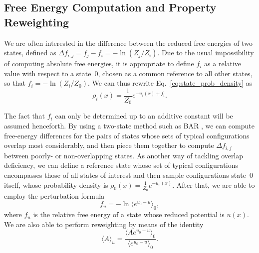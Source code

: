\documentclass[
    journal=jctcce,
    layout=twocolumn
]{achemso}
\begin{document}
\subsection{Free Energy Computation and Property Reweighting}
\label{sec:fep and reweighting}

We are often interested in the difference between the reduced free energies of two states, defined as $\Delta f_{i,j} = f_j - f_i = - \ln (Z_j/Z_i)$. Due to the usual impossibility of computing absolute free energies, it is appropriate to define $f_i$ as a relative value with respect to a state~$0$, chosen as a common reference to all other states, so that $f_i = -\ln (Z_i/Z_0)$. We can thus rewrite Eq.~\eqref{eq:state_prob_density} as
\begin{equation}
\label{eq:state_prob_density_Z0}
\rho_i(x) = \frac{1}{Z_0} e^{-u_i(x)+ f_i}.
\end{equation}

The fact that $f_i$ can only be determined up to an additive constant will be assumed henceforth. By using a two-state method such as BAR \cite{Bennett_1976}, we can compute free-energy differences for the pairs of states whose sets of typical configurations \cite{Jarzynski_1997} overlap most considerably, and then piece them together to compute $\Delta f_{i,j}$ between poorly- or non-overlapping states. As another way of tackling overlap deficiency, we can define a reference state whose set of typical configurations encompasses those of all states of interest and then sample configurations state~$0$ itself, whose probability density is $\rho_0(x) = \frac{1}{Z_0} e^{-u_0(x)}$. After that, we are able to employ the perturbation formula
\begin{equation}
\label{eq:free energy perturbation}
f_u = -\ln \langle e^{u_0-u} \rangle_0,
\end{equation}
where $f_u$ is the relative free energy of a state whose reduced potential is $u(x)$. We are also able to perform reweighting by means of the identity \cite{Torrie_1977}
\begin{equation}
\label{eq:nbs sampling reweighting}
\langle A \rangle_u = \frac{\langle A e^{u_0 - u} \rangle_0}{\langle e^{u_0 - u} \rangle_0}.
\end{equation}
\end{document}
